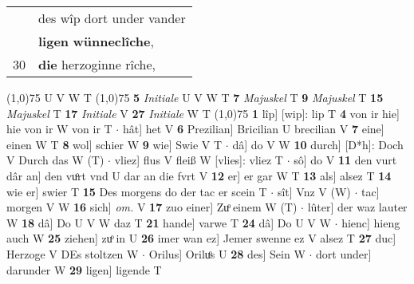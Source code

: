 \documentclass[8pt,a4paper,notitlepage]{article}
\begin{document}
\begin{table}[ht]
\begin{minipage}[t]{0.5\linewidth}
\begin{tabular}{rl}
 & des wîp dort under vander\\ 
 & \textbf{ligen} \textbf{wünneclîche},\\ 
30 & \textbf{die} herzoginne rîche,\\ 
\end{tabular}
\scriptsize
\line(1,0){75} \newline
U V W T \newline
\line(1,0){75} \newline
\textbf{5} \textit{Initiale} U V W T  \textbf{7} \textit{Majuskel} T  \textbf{9} \textit{Majuskel} T  \textbf{15} \textit{Majuskel} T  \textbf{17} \textit{Initiale} V  \textbf{27} \textit{Initiale} W T  \newline
\line(1,0){75} \newline
\textbf{1} lîp] [wip]: lip T \textbf{4} von ir hie] hie von ir W von ir T  $\cdot$ hât] het V \textbf{6} Prezilian] Bricilian U brecilian V \textbf{7} eine] einen W T \textbf{8} wol] schier W \textbf{9} wie] Swie V T  $\cdot$ dâ] do V W \textbf{10} durch] [D*h]: Doch V Durch das W (T)  $\cdot$ vliez] flus V fleiß W [vlies]: vliez T  $\cdot$ sô] do V \textbf{11} den vurt dâr an] den vuͦrt vnd U dar an die fvrt V \textbf{12} er] er gar W T \textbf{13} als] alsez T \textbf{14} wie er] swier T \textbf{15} Des morgens do der tac er scein T  $\cdot$ sît] Vnz V (W)  $\cdot$ tac] morgen V W \textbf{16} sich] \textit{om.} V \textbf{17} zuo einer] Zuͦ einem W (T)  $\cdot$ lûter] der waz lauter W \textbf{18} dâ] Do U V W daz T \textbf{21} hande] varwe T \textbf{24} dâ] Do U V W  $\cdot$ hienc] hieng auch W \textbf{25} ziehen] zuͦ in U \textbf{26} imer wan ez] Jemer swenne ez V alsez T \textbf{27} duc] Herzoge V DEs stoltzen W  $\cdot$ Orilus] Oriluͦs U \textbf{28} des] Sein W  $\cdot$ dort under] darunder W \textbf{29} ligen] ligende T \newline
\end{minipage}
\end{table}
\end{document}
